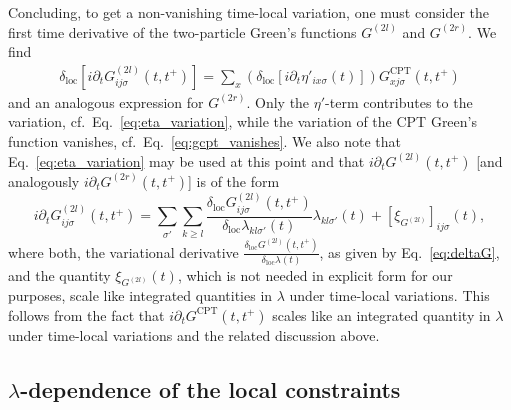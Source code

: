 \documentclass[twocolumn,prb,showpacs,aps,superscriptaddress]{revtex4}
\newcommand{\deltaloc}[0]{\ensuremath{\delta_\mathrm{loc}}}
\begin{document}
Concluding, to get a non-vanishing time-local variation, one must consider the
first time derivative of the two-particle Green's functions $G^{(2l)}$ and
$G^{(2r)}$.  We find
\begin{align}
  \label{eq:deltaG}
  \deltaloc 
  \left[
    i \partial_t G^{(2l)}_{ij\sigma}(t,t^+) 
  \right]
  =
  \sum_{x}
  \left(
    \deltaloc [i\partial_t \eta'_{ix\sigma}(t)]
  \right)
  G^\text{CPT}_{xj\sigma}(t,t^+)
\end{align}
and an analogous expression for $G^{(2r)}$.  Only the $\eta'$-term contributes
to the variation, cf.\ Eq.\ \eqref{eq:eta_variation}, while the variation of
the CPT Green's function vanishes, cf.\ Eq.\ \eqref{eq:gcpt_vanishes}.  We also
note that Eq.\ \eqref{eq:eta_variation} may be used at this point and that
$i\partial_t G^{(2l)}(t,t^+)$ [and analogously $i\partial_t G^{(2r)}(t,t^+)$]
is of the form
\begin{equation}
  \label{eq:idtG2}
  i\partial_t G^{(2l)}_{ij\sigma}(t,t^+)
  =
  \sum_{\sigma'}\sum_{k\ge l}
  \frac{\deltaloc G^{(2l)}_{ij\sigma}(t,t^+)}{\deltaloc \lambda_{kl\sigma'}(t)}
  \lambda_{kl\sigma'}(t)
  +
  [\xi_{G^{(2l)}}]_{ij\sigma}(t),
\end{equation}
where both, the variational derivative $\frac{\deltaloc G^{(2l)}(t,t^+)}
{\deltaloc \lambda(t)}$, as given by Eq.\ \eqref{eq:deltaG}, and the quantity
$\xi_{G^{(2l)}}(t)$, which is not needed in explicit form for our purposes,
scale like integrated quantities in $\lambda$ under time-local variations. This
follows from the fact that $i\partial_t G^\text{CPT}(t,t^+)$ scales like an
integrated quantity in $\lambda$ under time-local variations and the related
discussion above.

\subsection{$\lambda$-dependence of the local constraints} 
\label{sec:d}
\end{document}
